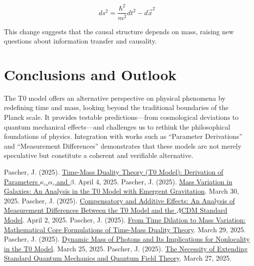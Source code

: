 \documentclass[a4paper,12pt]{article}
\begin{document}
	\begin{equation}
		ds^2 = \frac{\hbar^2}{m^2} dt^2 - d\vec{x}^2
	\end{equation}
	
	This change suggests that the causal structure depends on mass, raising new questions about information transfer and causality.
	
	\section{Conclusions and Outlook}
	
	The T0 model offers an alternative perspective on physical phenomena by redefining time and mass, looking beyond the traditional boundaries of the Planck scale. It provides testable predictions—from cosmological deviations to quantum mechanical effects—and challenges us to rethink the philosophical foundations of physics. Integration with works such as “Parameter Derivations” \cite{pascher_params_2025} and “Measurement Differences” \cite{pascher_messdifferenzen_2025} demonstrates that these models are not merely speculative but constitute a coherent and verifiable alternative.
	
	\begin{thebibliography}{99}
		 Pascher, J. (2025). \href{https://github.com/jpascher/T0-Time-Mass-Duality/tree/main/2/pdf/English/ZeitMasseT0ParamsEn.pdf}{Time-Mass Duality Theory (T0 Model): Derivation of Parameters \(\kappa\), \(\alpha\), and \(\beta\)}. April 4, 2025.
		 Pascher, J. (2025). \href{https://github.com/jpascher/T0-Time-Mass-Duality/tree/main/2/pdf/English/MassVarGalaxienEn.pdf}{Mass Variation in Galaxies: An Analysis in the T0 Model with Emergent Gravitation}. March 30, 2025.
		 Pascher, J. (2025). \href{https://github.com/jpascher/T0-Time-Mass-Duality/tree/main/2/pdf/English/MessdifferenzenT0StandardEn.pdf}{Compensatory and Additive Effects: An Analysis of Measurement Differences Between the T0 Model and the \(\Lambda\)CDM Standard Model}. April 2, 2025.
		 Pascher, J. (2025). \href{https://github.com/jpascher/T0-Time-Mass-Duality/tree/main/2/pdf/English/MathZeitMasseLagrange.pdf}{From Time Dilation to Mass Variation: Mathematical Core Formulations of Time-Mass Duality Theory}. March 29, 2025.
		 Pascher, J. (2025). \href{https://github.com/jpascher/T0-Time-Mass-Duality/tree/main/2/pdf/English/DynMassePhotonenNichtlokalEn.pdf}{Dynamic Mass of Photons and Its Implications for Nonlocality in the T0 Model}. March 25, 2025.
		 Pascher, J. (2025). \href{https://github.com/jpascher/T0-Time-Mass-Duality/tree/main/2/pdf/English/NotwendigkeitQMErweiterungEn.pdf}{The Necessity of Extending Standard Quantum Mechanics and Quantum Field Theory}. March 27, 2025.
	\end{thebibliography}
	
\end{document}
